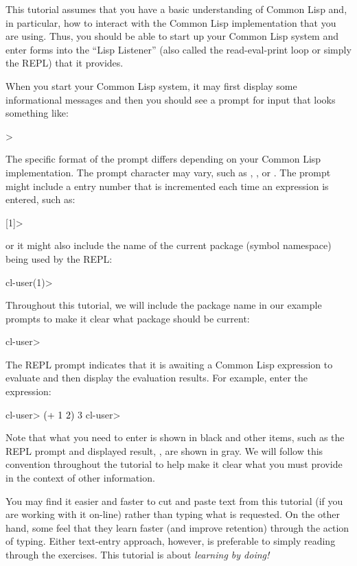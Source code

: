\documentclass[10pt,twoside,english,pdftex]{article}
\begin{document}
%
%
This tutorial assumes that you have a basic understanding of Common Lisp and,
in particular, how to interact with the Common Lisp implementation that you
are using.  Thus, you should be able to start up your Common Lisp system and
enter forms into the ``Lisp Listener'' (also called the read-eval-print loop
or simply the REPL) that it provides.  

When you start your Common Lisp system, it may first display some informational
messages and then you should see a prompt for input that looks something like:
%
\W\supp
\begin{example}
\textcolor{darkergray}{%
  >}
\end{example}
%
The specific format of the prompt differs depending on your Common Lisp
implementation.  The prompt character may vary, such as \code{*}, \code{:}, or
.  The prompt might include a entry number that is incremented each
time an expression is entered, such as:
%
\W\supp\notpretop
\begin{example}
\textcolor{darkergray}{%
  [1]>}
\end{example}
%
or it might also include the name of the current package (symbol namespace)
being used by the REPL:
%
\W\supp\notpretop
\begin{example}
\textcolor{darkergray}{%
  cl-user(1)>}
\end{example}

Throughout this tutorial, we will include the package name in our
example prompts to make it clear what package should be current:
%
\W\supp
\begin{example}%
\textcolor{darkergray}{%
  cl-user>}
\end{example}
%
The REPL prompt indicates that it is awaiting a Common Lisp expression to
evaluate and then display the evaluation results. For example, enter the
expression:
%
\W\supp\notpretop
\begin{example}
\textcolor{darkergray}{%
  cl-user> \textcolor{black}{(+ 1 2)}
  3
  cl-user>}
\end{example}
%
Note that what you need to enter is shown in black and other items, such as
the REPL prompt and displayed result, , are shown in gray.  We will
follow this convention throughout the tutorial to help make it clear what you
must provide in the context of other information.

You may find it easier and faster to cut and paste text from this tutorial (if
you are working with it on-line) rather than typing what is requested.  On the
other hand, some feel that they learn faster (and improve retention) through
the action of typing.  Either text-entry approach, however, is preferable to
simply reading through the exercises.  This tutorial is about \textit{learning by doing!}
\end{document}
